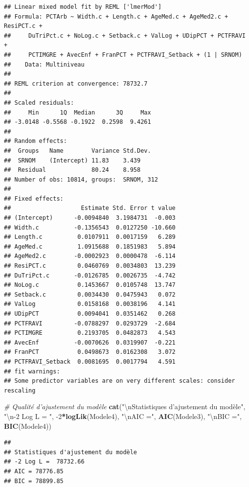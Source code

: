 \documentclass[
  11pt,
  french,
]{book}
\makeatletter
\newenvironment{Shaded}{\begin{snugshade}}{\end{snugshade}}
\newcommand{\CharTok}[1]{\textcolor[rgb]{0.31,0.60,0.02}{#1}}
\newcommand{\CommentTok}[1]{\textcolor[rgb]{0.56,0.35,0.01}{\textit{#1}}}
\newcommand{\DecValTok}[1]{\textcolor[rgb]{0.00,0.00,0.81}{#1}}
\newcommand{\KeywordTok}[1]{\textcolor[rgb]{0.13,0.29,0.53}{\textbf{#1}}}
\newcommand{\NormalTok}[1]{#1}
\newcommand{\OperatorTok}[1]{\textcolor[rgb]{0.81,0.36,0.00}{\textbf{#1}}}
\newcommand{\StringTok}[1]{\textcolor[rgb]{0.31,0.60,0.02}{#1}}
\newenvironment{kframe}{%
\medskip{}
\setlength{\fboxsep}{.8em}
 \def\at@end@of@kframe{}%
 \ifinner\ifhmode%
  \def\at@end@of@kframe{\end{minipage}}%
  \begin{minipage}{\columnwidth}%
 \fi\fi%
 \def\FrameCommand##1{\hskip\@totalleftmargin \hskip-\fboxsep
 \colorbox{shadecolor}{##1}\hskip-\fboxsep
     \hskip-\linewidth \hskip-\@totalleftmargin \hskip\columnwidth}%
 \MakeFramed {\advance\hsize-\width
   \@totalleftmargin\z@ \linewidth\hsize
   \@setminipage}}%
 {\par\unskip\endMakeFramed%
 \at@end@of@kframe}
\renewenvironment{Shaded}{\begin{kframe}}{\end{kframe}}
\makeatother
\begin{document}
\begin{verbatim}
## Linear mixed model fit by REML ['lmerMod']
## Formula: PCTArb ~ Width.c + Length.c + AgeMed.c + AgeMed2.c + ResiPCT.c +  
##     DuTriPct.c + NoLog.c + Setback.c + ValLog + UDipPCT + PCTFRAVI +  
##     PCTIMGRE + AvecEnf + FranPCT + PCTFRAVI_Setback + (1 | SRNOM)
##    Data: Multiniveau
## 
## REML criterion at convergence: 78732.7
## 
## Scaled residuals: 
##     Min      1Q  Median      3Q     Max 
## -3.0148 -0.5568 -0.1922  0.2598  9.4261 
## 
## Random effects:
##  Groups   Name        Variance Std.Dev.
##  SRNOM    (Intercept) 11.83    3.439   
##  Residual             80.24    8.958   
## Number of obs: 10814, groups:  SRNOM, 312
## 
## Fixed effects:
##                    Estimate Std. Error t value
## (Intercept)      -0.0094840  3.1984731  -0.003
## Width.c          -0.1356543  0.0127250 -10.660
## Length.c          0.0107911  0.0017159   6.289
## AgeMed.c          1.0915688  0.1851983   5.894
## AgeMed2.c        -0.0002923  0.0000478  -6.114
## ResiPCT.c         0.0460769  0.0034803  13.239
## DuTriPct.c       -0.0126785  0.0026735  -4.742
## NoLog.c           0.1453667  0.0105748  13.747
## Setback.c         0.0034430  0.0475943   0.072
## ValLog            0.0158168  0.0038196   4.141
## UDipPCT           0.0094041  0.0351462   0.268
## PCTFRAVI         -0.0788297  0.0293729  -2.684
## PCTIMGRE          0.2193705  0.0482873   4.543
## AvecEnf          -0.0070626  0.0319907  -0.221
## FranPCT           0.0498673  0.0162308   3.072
## PCTFRAVI_Setback  0.0081695  0.0017794   4.591
## fit warnings:
## Some predictor variables are on very different scales: consider rescaling
\end{verbatim}

\begin{Shaded}
\begin{Highlighting}[]
\CommentTok{# Qualité d'ajustement du modèle}
\KeywordTok{cat}\NormalTok{(}\StringTok{"}\CharTok{\textbackslash{}n}\StringTok{Statistiques d'ajustement du modèle"}\NormalTok{,}
    \StringTok{"}\CharTok{\textbackslash{}n}\StringTok{-2 Log L = "}\NormalTok{, }\DecValTok{-2}\OperatorTok{*}\KeywordTok{logLik}\NormalTok{(Modele4),}
    \StringTok{"}\CharTok{\textbackslash{}n}\StringTok{AIC ="}\NormalTok{, }\KeywordTok{AIC}\NormalTok{(Modele3), }\StringTok{"}\CharTok{\textbackslash{}n}\StringTok{BIC ="}\NormalTok{, }\KeywordTok{BIC}\NormalTok{(Modele4))}
\end{Highlighting}
\end{Shaded}

\begin{verbatim}
## 
## Statistiques d'ajustement du modèle 
## -2 Log L =  78732.66 
## AIC = 78776.85 
## BIC = 78899.85
\end{verbatim}
\end{document}
